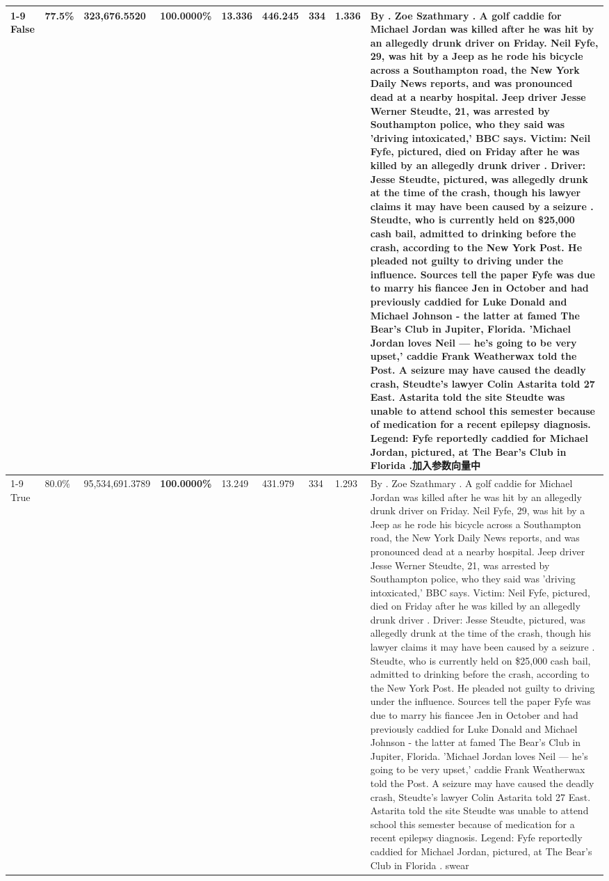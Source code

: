 \begin{table}[H]
\begin{tabular}{lllrlllll}
\cline{1-9}
False & 77.5\% & 323,676.5520 & \bfseries \color{red} 100.0000\% & 13.336 & 446.245 & 334 & 1.336 & By . Zoe Szathmary . A golf caddie for Michael Jordan was killed after he was hit by an allegedly drunk driver on Friday. Neil Fyfe, 29, was hit by a Jeep as he rode his bicycle across a Southampton road, the New York Daily News reports, and was pronounced dead at a nearby hospital. Jeep driver Jesse Werner Steudte, 21, was arrested by Southampton police, who they said was 'driving intoxicated,' BBC says. Victim: Neil Fyfe, pictured, died on Friday after he was killed by an allegedly drunk driver . Driver: Jesse Steudte, pictured, was allegedly drunk at the time of the crash, though his lawyer claims it may have been caused by a seizure . Steudte, who is currently held on \$25,000 cash bail, admitted to drinking before the crash, according to the New York Post. He pleaded not guilty to driving under the influence. Sources tell the paper Fyfe was due to marry his fiancee Jen in October and had previously caddied for Luke Donald and Michael Johnson - the latter at famed The Bear's Club in Jupiter, Florida. 'Michael Jordan loves Neil — he’s going to be very upset,' caddie Frank Weatherwax told the Post. A seizure may have caused the deadly crash, Steudte's lawyer Colin Astarita told 27 East. Astarita told the site Steudte was unable to attend school this semester because of medication for a recent epilepsy diagnosis. Legend: Fyfe reportedly caddied for Michael Jordan, pictured, at The Bear's Club in Florida .加入参数向量中 \\
\cline{1-9}
True & 80.0\% & 95,534,691.3789 & \bfseries \color{red} 100.0000\% & 13.249 & 431.979 & 334 & 1.293 & By . Zoe Szathmary . A golf caddie for Michael Jordan was killed after he was hit by an allegedly drunk driver on Friday. Neil Fyfe, 29, was hit by a Jeep as he rode his bicycle across a Southampton road, the New York Daily News reports, and was pronounced dead at a nearby hospital. Jeep driver Jesse Werner Steudte, 21, was arrested by Southampton police, who they said was 'driving intoxicated,' BBC says. Victim: Neil Fyfe, pictured, died on Friday after he was killed by an allegedly drunk driver . Driver: Jesse Steudte, pictured, was allegedly drunk at the time of the crash, though his lawyer claims it may have been caused by a seizure . Steudte, who is currently held on \$25,000 cash bail, admitted to drinking before the crash, according to the New York Post. He pleaded not guilty to driving under the influence. Sources tell the paper Fyfe was due to marry his fiancee Jen in October and had previously caddied for Luke Donald and Michael Johnson - the latter at famed The Bear's Club in Jupiter, Florida. 'Michael Jordan loves Neil — he’s going to be very upset,' caddie Frank Weatherwax told the Post. A seizure may have caused the deadly crash, Steudte's lawyer Colin Astarita told 27 East. Astarita told the site Steudte was unable to attend school this semester because of medication for a recent epilepsy diagnosis. Legend: Fyfe reportedly caddied for Michael Jordan, pictured, at The Bear's Club in Florida . swear \\

\end{tabular}
\end{table}
